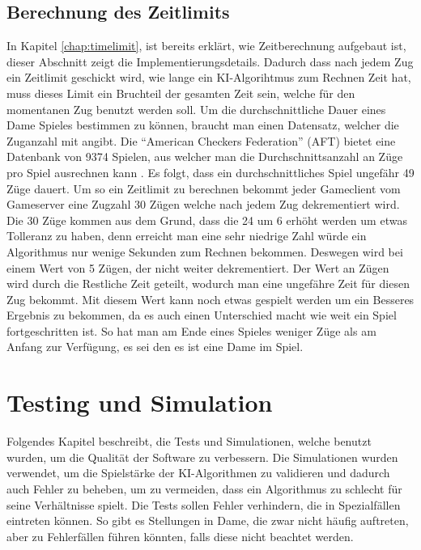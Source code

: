 \documentclass[12pt,a4paper,bibliography=totocnumbered,listof=totocnumbered]{article}
\begin{document}
\subsection{Berechnung des Zeitlimits}
In Kapitel \ref{chap:timelimit}, ist bereits erklärt, wie Zeitberechnung aufgebaut ist, dieser Abschnitt zeigt die Implementierungsdetails.
Dadurch dass nach jedem Zug ein Zeitlimit geschickt wird, wie lange ein KI-Algorihtmus zum Rechnen Zeit hat, muss dieses Limit ein Bruchteil 
der gesamten Zeit sein, welche für den momentanen Zug benutzt werden soll. Um die durchschnittliche Dauer eines Dame Spieles bestimmen zu können,
braucht man einen Datensatz, welcher die Zuganzahl mit angibt. Die ``American Checkers Federation'' (AFT) bietet eine Datenbank von 9374 Spielen,
aus welcher man die Durchschnittsanzahl an Züge pro Spiel ausrechnen kann \cite{CheckersFederation}. Es folgt, dass ein durchschnittliches Spiel 
ungefähr 49 Züge dauert. Um so ein Zeitlimit zu berechnen bekommt jeder Gameclient vom Gameserver eine Zugzahl 30 Zügen welche nach jedem Zug 
dekrementiert wird. Die 30 Züge kommen aus dem Grund, dass die 24 um 6 erhöht werden um etwas Tolleranz zu haben, denn erreicht man 
eine sehr niedrige Zahl würde ein Algorithmus nur wenige Sekunden zum Rechnen bekommen. Deswegen wird bei einem Wert von 5 Zügen, 
der nicht weiter dekrementiert. Der Wert an Zügen wird durch 
die Restliche Zeit geteilt, wodurch man eine ungefähre Zeit für diesen Zug bekommt. Mit diesem Wert kann noch etwas gespielt werden um 
ein Besseres Ergebnis zu bekommen, da es auch einen Unterschied macht wie weit ein Spiel fortgeschritten ist. So hat man am Ende eines Spieles 
weniger Züge als am Anfang zur Verfügung, es sei den es ist eine Dame im Spiel. 

\pagebreak

\section{Testing und Simulation}
Folgendes Kapitel beschreibt, die Tests und Simulationen, welche benutzt wurden, um die Qualität der Software zu verbessern. Die Simulationen wurden verwendet, um 
die Spielstärke der KI-Algorithmen zu validieren und dadurch auch Fehler zu beheben, um zu vermeiden, dass ein Algorithmus zu schlecht für seine Verhältnisse spielt.
Die Tests sollen Fehler verhindern, die in Spezialfällen eintreten können. So gibt es Stellungen in Dame, die zwar nicht häufig auftreten, 
aber zu Fehlerfällen führen könnten, falls diese nicht beachtet werden.
\end{document}
